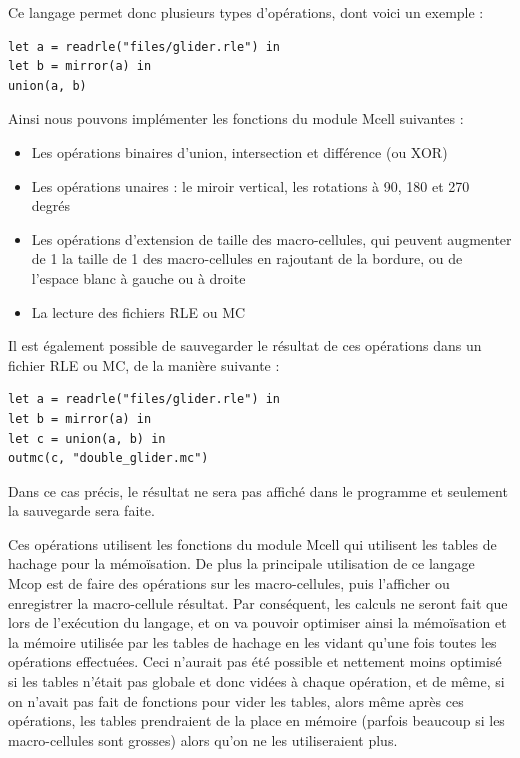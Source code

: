 \documentclass[a4paper,12pt]{report}
\begin{document}
Ce langage permet donc plusieurs types d'opérations, dont voici un exemple :
\begin{verbatim}
let a = readrle("files/glider.rle") in
let b = mirror(a) in
union(a, b)
\end{verbatim}

Ainsi nous pouvons implémenter les fonctions du module Mcell suivantes :
\begin{itemize}
\item Les opérations binaires d'union, intersection et différence (ou XOR)
\item Les opérations unaires : le miroir vertical, les rotations à 90, 180 et
  270 degrés
\item Les opérations d'extension de taille des macro-cellules, qui peuvent
  augmenter de 1 la taille de 1 des macro-cellules en rajoutant de la bordure,
  ou de l'espace blanc à gauche ou à droite
\item La lecture des fichiers RLE ou MC
\end{itemize}

Il est également possible de sauvegarder le résultat de ces opérations dans un
fichier RLE ou MC, de la manière suivante :
\begin{verbatim}
let a = readrle("files/glider.rle") in
let b = mirror(a) in
let c = union(a, b) in
outmc(c, "double_glider.mc")
\end{verbatim}

Dans ce cas précis, le résultat ne sera pas affiché dans le programme et
seulement la sauvegarde sera faite.

\medskip

Ces opérations utilisent les fonctions du module Mcell
qui utilisent les tables de hachage pour la mémoïsation. De plus la
principale utilisation de ce langage Mcop est de faire des opérations
sur les macro-cellules, puis l'afficher ou enregistrer la
macro-cellule résultat. Par conséquent, les calculs ne seront fait que
lors de l'exécution du langage, et on va pouvoir optimiser ainsi la
mémoïsation et la mémoire utilisée par les tables de hachage en les
vidant qu'une fois toutes les opérations effectuées. Ceci n'aurait pas
été possible et nettement moins optimisé si les tables n'était pas
globale et donc vidées à chaque opération, et de même, si on n'avait
pas fait de fonctions pour vider les tables, alors même après ces
opérations, les tables prendraient de la place en mémoire (parfois
beaucoup si les macro-cellules sont grosses) alors qu'on ne les
utiliseraient plus.
\end{document}
